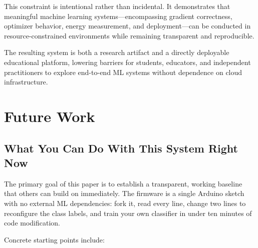 \documentclass[12pt]{article}
\begin{document}
This constraint is intentional rather than incidental.
It demonstrates that meaningful machine learning systems---encompassing gradient
correctness, optimizer behavior, energy measurement, and deployment---can be
conducted in resource-constrained environments while remaining transparent and
reproducible.

The resulting system is both a research artifact and a directly deployable
educational platform, lowering barriers for students, educators, and independent
practitioners to explore end-to-end ML systems without dependence on cloud
infrastructure.

\section{Future Work}
\label{sec:future}

\subsection{What You Can Do With This System Right Now}
\label{subsec:what_you_can_do}

The primary goal of this paper is to establish a transparent, working baseline
that others can build on immediately.
The firmware is a single Arduino sketch with no external ML dependencies: fork
it, read every line, change two lines to reconfigure the class labels, and train
your own classifier in under ten minutes of code modification.

Concrete starting points include:
\end{document}
